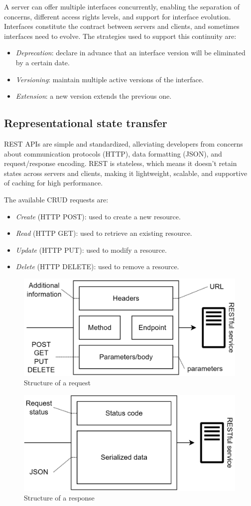 A server can offer multiple interfaces concurrently, enabling the separation of concerns, different access rights levels, and support for interface evolution.
Interfaces constitute the contract between servers and clients, and sometimes interfaces need to evolve.
The strategies used to support this continuity are: 
\begin{itemize}
    \item \textit{Deprecation}: declare in advance that an interface version will be eliminated by a certain date.
    \item \textit{Versioning}: maintain multiple active versions of the interface.
    \item \textit{Extension}: a new version extends the previous one. 
\end{itemize}

\subsection{Representational state transfer}
REST APIs are simple and standardized, alleviating developers from concerns about communication protocols (HTTP), data formatting (JSON), and request/response encoding. 
REST is stateless, which means it doesn't retain states across servers and clients, making it lightweight, scalable, and supportive of caching for high performance.

The available CRUD requests are:
\begin{itemize}
    \item \textit{Create} (HTTP POST): used to create a new resource.
    \item \textit{Read} (HTTP GET): used to retrieve an existing resource.
    \item \textit{Update} (HTTP PUT): used to modify a resource.
    \item \textit{Delete} (HTTP DELETE): used to remove a resource.
\end{itemize}
\begin{figure}[H]
    \centering
    \includegraphics[width=0.6\linewidth]{images/rest.png}
    \caption{Structure of a request}
\end{figure}
\begin{figure}[H]
    \centering
    \includegraphics[width=0.6\linewidth]{images/rest1.png}
    \caption{Structure of a response}
\end{figure}

